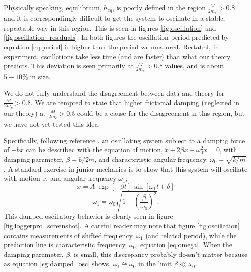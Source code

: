 \documentclass[12pt]{iopart}
\newcommand{\be}{\begin{equation}}
\newcommand{\ee}{\end{equation}}
\begin{document}

Physically speaking, equilibrium, $h_{eq}$, is poorly defined in the region $\frac{M}{2m_c}>0.8$ and it is correspondingly difficult to get the system to oscillate in a stable, repeatable way in this region.  This is seen in  figures \ref{fig:oscillation} and \ref{fig:oscillation_residuals}.  In both figures the oscillation period predicted by equation \ref{eq:period} is higher than the period we measured. Restated, in experiment, oscillations take less time (and are faster) than what our theory predicts.  This deviation is seen primarily at $\frac{M}{2m_c}>0.8$ values, and is about $5-10\%$ in size.  

We do not fully understand the disagreement between data and theory for $\frac{M}{2m_c}>0.8$. We are tempted to state that  higher frictional damping (neglected in our theory) at $\frac{M}{2m_c}>0.8$ could be a cause for the disagreement  in this region, but we have not yet tested this idea.  


%
%
Specifically, following reference \cite{Mechanics_reference}, an oscillating system subject to a damping force of $-b\dot{x}$ can be described with the equation of motion,
$\ddot{x} + 2 \beta \dot{x} + \omega_0^2 x = 0$,
with damping parameter, $\beta=b/2m$, 
and characteristic angular frequency, $\omega_0=\sqrt{k/m}$.
A standard exercise in junior mechanics is to show that this system will oscillate with motion $x$, and angular frequency $\omega_1$,
\be
x = A~\exp\left[-\beta t\right] ~\sin\left[ \omega_1 t+\delta \right]
\label{eq:damped_osc_y}
\ee
\be
\omega_1 = \omega_0 \sqrt{1 - \left( \frac{\beta}{\omega_0} \right)^2 }.
\label{eg:damped_osc}
\ee
This damped oscillatory behavior is clearly seen in figure \ref{fig:loggerpro_screenshot}.  A careful reader may note that figure \ref{fig:oscillation} contains measurements of shifted frequency, $\omega_1$ (and related period), while the prediction line is characteristic frequency, $\omega_0$, equation \ref{eq:omega}.  When the damping parameter, $\beta$, is  small, this discrepancy probably doesn't matter because as equation \ref{eg:damped_osc} shows, $\omega_1 \cong \omega_0$ in the limit $\beta\ll \omega_0$.
\end{document}
